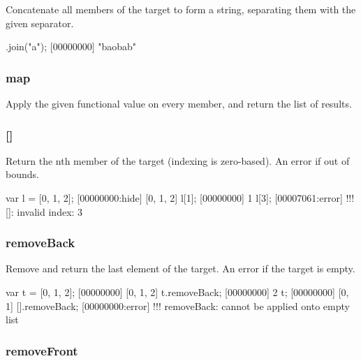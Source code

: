 Concatenate all members of the target to form a string, separating
them with the given separator.

\begin{urbiscript}[firstnumber=last]
["b", "ob", "b"].join("a");
[00000000] "baobab"
\end{urbiscript}

\subsubsection{map}

Apply the given functional value on every member, and return the list
of results.


\subsubsection{[]}
\label{sec:std-list-nth}

Return the nth member of the target (indexing is zero-based). An error
if out of bounds.

\begin{urbiscript}[firstnumber=last]
var l = [0, 1, 2];
[00000000:hide] [0, 1, 2]
l[1];
[00000000] 1
l[3];
[00007061:error] !!! []: invalid index: 3
\end{urbiscript}

\subsubsection{removeBack}

Remove and return the last element of the target. An error if the
target is empty.

\begin{urbiscript}[firstnumber=last]
var t = [0, 1, 2];
[00000000] [0, 1, 2]
t.removeBack;
[00000000] 2
t;
[00000000] [0, 1]
[].removeBack;
[00000000:error] !!! removeBack: cannot be applied onto empty list
\end{urbiscript}

\subsubsection{removeFront}

